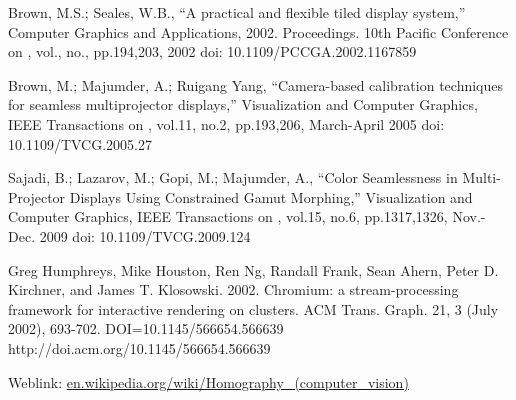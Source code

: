 \documentclass{article}
\begin{document}
\begin{thebibliography}{1}
Brown, M.S.; Seales, W.B., ``A practical and flexible tiled display system,'' Computer Graphics and Applications, 2002. Proceedings. 10th Pacific Conference on , vol., no., pp.194,203, 2002
doi: 10.1109/PCCGA.2002.1167859

Brown, M.; Majumder, A.; Ruigang Yang, ``Camera-based calibration techniques for seamless multiprojector displays,'' Visualization and Computer Graphics, IEEE Transactions on , vol.11, no.2, pp.193,206, March-April 2005
doi: 10.1109/TVCG.2005.27

Sajadi, B.; Lazarov, M.; Gopi, M.; Majumder, A., ``Color Seamlessness in Multi-Projector Displays Using Constrained Gamut Morphing,'' Visualization and Computer Graphics, IEEE Transactions on , vol.15, no.6, pp.1317,1326, Nov.-Dec. 2009
doi: 10.1109/TVCG.2009.124

Greg Humphreys, Mike Houston, Ren Ng, Randall Frank, Sean Ahern, Peter D. Kirchner, and James T. Klosowski. 2002. Chromium: a stream-processing framework for interactive rendering on clusters. ACM Trans. Graph. 21, 3 (July 2002), 693-702. DOI=10.1145/566654.566639 http://doi.acm.org/10.1145/566654.566639

Weblink:\newline
\url{en.wikipedia.org/wiki/Homography_(computer_vision)‎}

\end{thebibliography}
\end{document}
